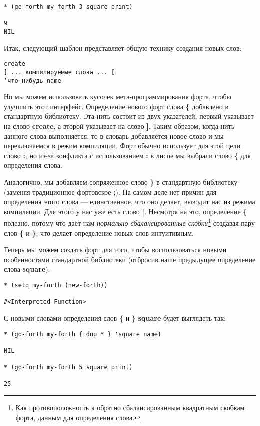 \begin{verbatim}
* (go-forth my-forth 3 square print)

9 
NIL
\end{verbatim}

Итак, следующий шаблон представляет общую технику создания новых слов:

\begin{verbatim}
create
] ... компилируемые слова ... [
’что-нибудь name
\end{verbatim}

Но мы можем использовать кусочек мета-программирования форта, чтобы улучшить этот интерфейс. Определение  нового форт слова \textbf{\{} добавлено в стандартную библиотеку. Эта нить состоит из двух указателей, первый указывает на слово \textbf{create}, а второй указывает на слово \textbf{]}. Таким образом, когда нить данного слова выполняется, то в словарь добавляется новое слово и мы переключаемся в режим компиляции. Форт обычно использует для этой цели слово \textbf{:}, но из-за конфликта с использованием \textbf{:} в лиспе мы выбрали слово \textbf{\{} для определения слова.

Аналогично, мы добавляем сопряженное слово \textbf{\}} в стандартную библиотеку (заменяя традиционное фортовское \textbf{;}). На самом деле нет причин для определения этого слова --- единственное, что оно делает, выводит нас из режима компиляции. Для этого у нас уже есть слово \textbf{[}. Несмотря на это, определение \textbf{\{} полезно, потому что даёт нам \emph{нормально сбалансированные скобки}\footnote{Как противоположность к обратно сбалансированным квадратным скобкам форта, данным для определения слова.} создавая пару слов \textbf{\{} и \textbf{\}}, что делает определение новых слов интуитивным.

Теперь мы можем создать форт для того, чтобы воспользоваться новыми особенностями стандартной библиотеки (отбросив наше предыдущее определение слова \textbf{square}):

\begin{verbatim}
* (setq my-forth (new-forth))

#<Interpreted Function>
\end{verbatim}

С новыми словами определения слов \textbf{\{} и \textbf{\}} \textbf{square} будет выглядеть так:

\begin{verbatim}
* (go-forth my-forth { dup * } 'square name)

NIL

* (go-forth my-forth 5 square print)

25
\end{verbatim}

